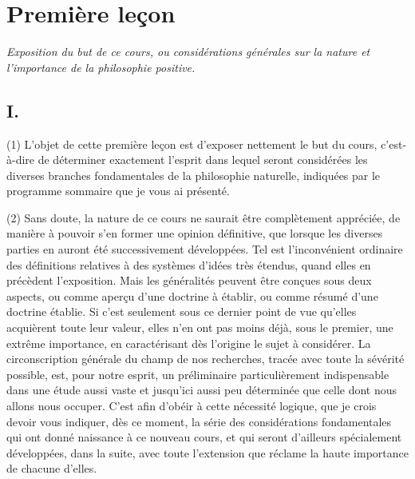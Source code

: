\documentclass[french,twoside]{book} %
\newcommand{\dateline}[1]{\medskip{\RaggedLeft{#1}\par}\bigskip}
\newcommand\chapteropen{} %
\newcommand\chaptercont{} %
\begin{document}
\dateline{Paris, le 18 décembre 1829.}

\chapteropen
\chapter[{Première leçon}]{Première leçon}
\label{leçon\_1}\renewcommand{\leftmark}{Première leçon}

\begin{center}\emph{Exposition du but de ce cours, ou considérations générales sur la nature et l’importance de la philosophie positive.}\end{center}

\chaptercont
\section[{I.}]{I.}
\noindent (1) L’objet de cette première leçon est d’exposer nettement le but du cours, c’est-à-dire de déterminer exactement l’esprit dans lequel seront considérées les diverses branches fondamentales de la philosophie naturelle, indiquées par le programme sommaire que je vous ai présenté.\par
(2) Sans doute, la nature de ce cours ne saurait être complètement appréciée, de manière à pouvoir s’en former une opinion définitive, que lorsque les diverses parties en auront été successivement développées. Tel est l’inconvénient ordinaire des définitions relatives à des systèmes d’idées très étendus, quand elles en précèdent l’exposition. Mais les généralités peuvent être conçues sous deux aspects, ou comme aperçu d’une doctrine à établir, ou comme résumé d’une doctrine établie. Si c’est seulement sous ce dernier point de vue qu’elles acquièrent toute leur valeur, elles n’en ont pas moins déjà, sous le premier, une extrême importance, en caractérisant dès l’origine le sujet à considérer. La circonscription générale du champ de nos recherches, tracée avec toute la sévérité possible, est, pour notre esprit, un préliminaire particulièrement indispensable dans une étude aussi vaste et jusqu’ici aussi peu déterminée que celle dont nous allons nous occuper. C’est afin d’obéir à cette nécessité logique, que je crois devoir vous indiquer, dès ce moment, la série des considérations fondamentales qui ont donné naissance à ce nouveau cours, et qui seront d’ailleurs spécialement développées, dans la suite, avec toute l’extension que réclame la haute importance de chacune d’elles.
\end{document}
